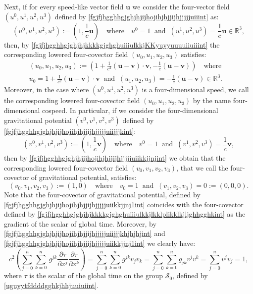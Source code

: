 \documentclass{article}
\theoremstyle{definition}
\theoremstyle{remark}
\renewcommand{\vec}[1]{\mathbf{#1}}
\newcommand{\er}{\eqref}
\newcommand{\er}{\eqref}
\begin{document}
Next, if for every speed-like vector field $\vec u$ we consider the
four-vector field $(u^0,u^1,u^2,u^3)$ defined by
\er{fgjfjhgghhgjghjhjijhojihjhjjijhjjjjjuiiint} as:
\begin{equation}\label{fgjfjhgghhgjghjhjijhojihjhjjijhjjjjjuiikkjint}
(u^0,u^1,u^2,u^3):=\left(1,\frac{1}{c}\vec
u\right)\quad\text{where}\quad
u^0=1\;\;\text{and}\;\;(u^1,u^2,u^3)=\frac{1}{c}\vec
u\in\mathbb{R}^3,
\end{equation}
then, by \er{fgjfjhgghhgjghjhjkkkkgjghghuiiiulkkjKKyuyyuuuuiiuiiint}
the corresponding lowered four-covector field $(u_0,u_1,u_2,u_3)$
satisfies:
\begin{multline}\label{fgjfjhgghhgjghjhjijhojihjhjjijhjjjjjuiikkjjnjint}
(u_0,u_1,u_2,u_3):=\left(1+\frac{1}{c^2}\left(\vec u-\vec
v\right)\cdot\vec v,-\frac{1}{c}\left(\vec u-\vec
v\right)\right)\quad\text{where}\quad\\
u_0=1+\frac{1}{c^2}\left(\vec u-\vec v\right)\cdot\vec
v\;\;\text{and}\;\;(u_1,u_2,u_3)=-\frac{1}{c}\left(\vec u-\vec
v\right)\in\mathbb{R}^3.
\end{multline}
Moreover, in the case where $(u^0,u^1,u^2,u^3)$  is a
four-dimensional speed, we call the corresponding lowered
four-covector field $(u_0,u_1,u_2,u_3)$ by the name four-dimensional
cospeed. In particular, if we consider the four-dimensional
gravitational potential $(v^0,v^1,v^2,v^3)$ defined by
\er{fgjfjhgghhgjghjhjijhojihjhjjijhjjjjjuiijjjkint}:
\begin{equation}\label{fgjfjhgghhgjghjhjijhojihjhjjijhjjjjjuiijjjkhjhjhjint}
(v^0,v^1,v^2,v^3):=\left(1,\frac{1}{c}\vec
v\right)\quad\text{where}\quad
v^0=1\;\;\text{and}\;\;(v^1,v^2,v^3)=\frac{1}{c}\vec v,
\end{equation}
then by \er{fgjfjhgghhgjghjhjijhojihjhjjijhjjjjjuiikkjjnjint} we
obtain that the corresponding lowered four-covector field
$(v_0,v_1,v_2,v_3)$, that we call the four-covector of gravitational
potential, satisfies:
\begin{equation}\label{fgjfjhgghhgjghjhjijhojihjhjjijhjjjjjuiikkjjnj1int}
(v_0,v_1,v_2,v_3):=\left(1,0\right)\quad\text{where}\quad
v_0=1\;\;\text{and}\;\;(v_1,v_2,v_3)=0:=(0,0,0).
\end{equation}
Note that the four-covector of gravitational potential, defined by
\er{fgjfjhgghhgjghjhjijhojihjhjjijhjjjjjuiikkjjnj1int} coincides
with the four-covector defined by
\er{fgjfjhgghhgjghjhjkkkkgjghghuiiiulkkjlkklplikklkjljghhgghkint} as
the gradient of the scalar of global time. Moreover, by
\er{fgjfjhgghhgjghjhjijhojihjhjjijhjjjjjuiijjjkhjhjhjint} and
\er{fgjfjhgghhgjghjhjijhojihjhjjijhjjjjjuiikkjjnj1int} we clearly
have:
\begin{equation}\label{fgjfjhgghhgjghjhjijhojihjhjjijhjjjjjuiijjjkhjhjhjuiiuuuyuint}
c^2\left(\sum_{j=0}^{n}\sum_{k=0}^{n}\,g^{jk}\frac{\partial\tau}{\partial
x^j}\frac{\partial\tau}{\partial
x^k}\right)=\sum_{j=0}^{n}\sum_{k=0}^{n}g^{jk}v_jv_k=\sum_{j=0}^{n}\sum_{k=0}^{n}g_{jk}v^jv^k=\sum_{j=0}^{n}v^jv_j=1,
\end{equation}
where $\tau$ is the scalar of the global time on the group
$\mathcal{S}_0$, defined by \er{uguyytfddddgghkjhhjuuiuiint}.
\end{document}
